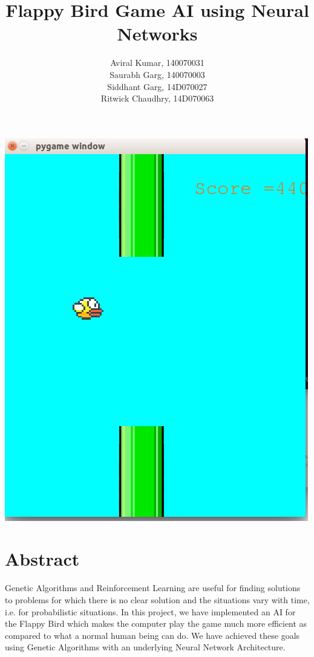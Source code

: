 \documentclass{article}
\begin{document}
\title{\textbf{Flappy Bird Game AI using Neural Networks}}
\author{Aviral Kumar, 140070031 \\Saurabh Garg, 140070003\\ Siddhant Garg, 14D070027\\ Ritwick Chaudhry, 14D070063 }

\maketitle
\begin{center}
\includegraphics[width=0.35\vsize, angle = 0]{screenshot.png} \\
\end{center}
\pagebreak
\tableofcontents
\pagebreak

\section{Abstract}
Genetic Algorithms and Reinforcement Learning are useful for finding solutions to problems for which there is no clear solution and the situations vary with time, i.e. for probabilistic situations. In this project, we have implemented an AI for the Flappy Bird which makes the computer play the game much more efficient as compared to what a normal human being can do. We have achieved these goals using Genetic Algorithms with an underlying Neural Network Architecture.
\end{document}
